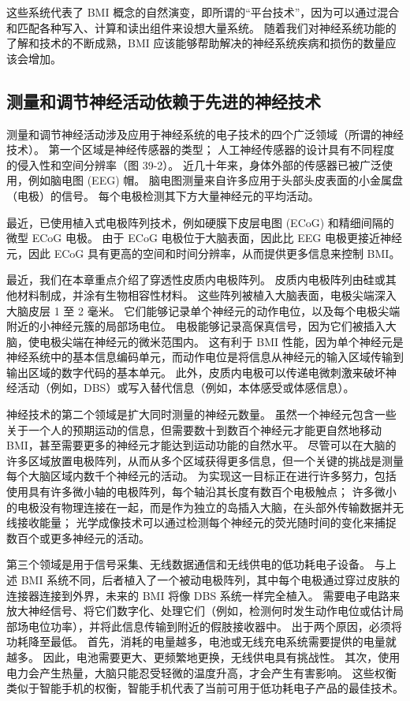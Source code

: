 这些系统代表了 BMI 概念的自然演变，即所谓的“平台技术”，因为可以通过混合和匹配各种写入、计算和读出组件来设想大量系统。 随着我们对神经系统功能的了解和技术的不断成熟，BMI 应该能够帮助解决的神经系统疾病和损伤的数量应该会增加。

\subsection{测量和调节神经活动依赖于先进的神经技术}

测量和调节神经活动涉及应用于神经系统的电子技术的四个广泛领域（所谓的神经技术）。 第一个区域是神经传感器的类型； 人工神经传感器的设计具有不同程度的侵入性和空间分辨率（图 39-2）。 近几十年来，身体外部的传感器已被广泛使用，例如脑电图 (EEG) 帽。 脑电图测量来自许多应用于头部头皮表面的小金属盘（电极）的信号。 每个电极检测其下方大量神经元的平均活动。

最近，已使用植入式电极阵列技术，例如硬膜下皮层电图 (ECoG) 和精细间隔的微型 ECoG 电极。 由于 ECoG 电极位于大脑表面，因此比 EEG 电极更接近神经元，因此 ECoG 具有更高的空间和时间分辨率，从而提供更多信息来控制 BMI。

最近，我们在本章重点介绍了穿透性皮质内电极阵列。 皮质内电极阵列由硅或其他材料制成，并涂有生物相容性材料。 这些阵列被植入大脑表面，电极尖端深入大脑皮层 1 至 2 毫米。 它们能够记录单个神经元的动作电位，以及每个电极尖端附近的小神经元簇的局部场电位。 电极能够记录高保真信号，因为它们被插入大脑，使电极尖端在神经元的微米范围内。 这有利于 BMI 性能，因为单个神经元是神经系统中的基本信息编码单元，而动作电位是将信息从神经元的输入区域传输到输出区域的数字代码的基本单元。 此外，皮质内电极可以传递电微刺激来破坏神经活动（例如，DBS）或写入替代信息（例如，本体感受或体感信息）。

神经技术的第二个领域是扩大同时测量的神经元数量。 虽然一个神经元包含一些关于一个人的预期运动的信息，但需要数十到数百个神经元才能更自然地移动 BMI，甚至需要更多的神经元才能达到运动功能的自然水平。 尽管可以在大脑的许多区域放置电极阵列，从而从多个区域获得更多信息，但一个关键的挑战是测量每个大脑区域内数千个神经元的活动。 为实现这一目标正在进行许多努力，包括使用具有许多微小轴的电极阵列，每个轴沿其长度有数百个电极触点； 许多微小的电极没有物理连接在一起，而是作为独立的岛插入大脑，在头部外传输数据并无线接收能量； 光学成像技术可以通过检测每个神经元的荧光随时间的变化来捕捉数百个或更多神经元的活动。

第三个领域是用于信号采集、无线数据通信和无线供电的低功耗电子设备。 与上述 BMI 系统不同，后者植入了一个被动电极阵列，其中每个电极通过穿过皮肤的连接器连接到外界，未来的 BMI 将像 DBS 系统一样完全植入。 需要电子电路来放大神经信号、将它们数字化、处理它们（例如，检测何时发生动作电位或估计局部场电位功率），并将此信息传输到附近的假肢接收器中。 出于两个原因，必须将功耗降至最低。 首先，消耗的电量越多，电池或无线充电系统需要提供的电量就越多。 因此，电池需要更大、更频繁地更换，无线供电具有挑战性。 其次，使用电力会产生热量，大脑只能忍受轻微的温度升高，才会产生有害影响。 这些权衡类似于智能手机的权衡，智能手机代表了当前可用于低功耗电子产品的最佳技术。


